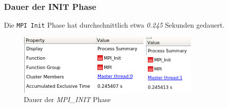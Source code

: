 \documentclass[12pt]{article}
\begin{document}
\begin{sloppypar}
\subsubsection*{Dauer der INIT Phase}
Die \verb|MPI Init| Phase hat durchschnittlich etwa \textit{0.245} Sekunden gedauert.
\begin{figure}[ht]
    \centering
    \caption*{Dauer der \textit{MPI\_INIT} Phase}
    \begin{minipage}[t]{0.3\textwidth}
        \includegraphics[width=\textwidth]{res/init-phase-p0.PNG}
    \end{minipage}
    \begin{minipage}[t]{0.12\textwidth}
        \includegraphics[width=\textwidth]{res/init-phase-p1.PNG}

\end{minipage}
\end{figure}
\end{sloppypar}
\end{document}
